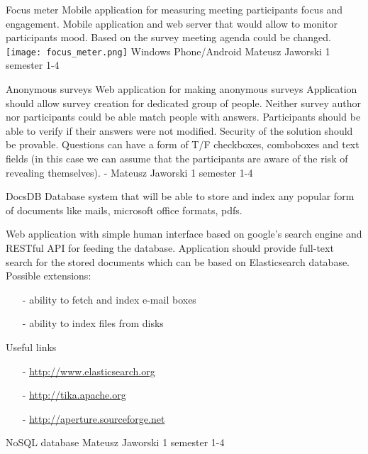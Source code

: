 \begin{project}
{Focus meter}
{Mobile application for measuring meeting participants focus and engagement.}
{
Mobile application and web server that would allow to
monitor participants mood. Based on the survey meeting
agenda could be changed.
\texttt{[image: focus\_meter.png]}
}
{Windows Phone/Android}
{Mateusz Jaworski}
{1 semester}
{1-4}
\end{project}
\begin{project}
{Anonymous surveys}
{Web application for making anonymous surveys}
{
Application should allow survey creation for dedicated group of people. 
Neither survey author nor participants could be able match people with answers.
Participants should be able to verify if their answers were not modified. 
Security of the solution should be provable. Questions can have a form of T/F
checkboxes, comboboxes and text fields (in this case we can assume that the
participants are aware of the risk of revealing themselves).
}
{-}
{Mateusz Jaworski}
{1 semester}
{1-4}
\end{project}
\begin{project}
{DocsDB}
{Database system that will be able to store and index any popular form of
documents like mails, microsoft office formats, pdfs.}
{
Web application with simple human interface based on google’s search engine and RESTful API for feeding the database.
Application should provide full-text search for the stored documents which can be based on Elasticsearch database.
Possible extensions:
\begin{itemize}
  \item[-] ability to fetch and index e-mail boxes
  \item[-] ability to index files from disks
\end{itemize}
Useful links
\begin{itemize}
  \item[-] \url{http://www.elasticsearch.org}
  \item[-] \url{http://tika.apache.org}
  \item[-] \url{http://aperture.sourceforge.net}
\end{itemize}
}
{NoSQL database}
{Mateusz Jaworski}
{1 semester}
{1-4}
\end{project}
